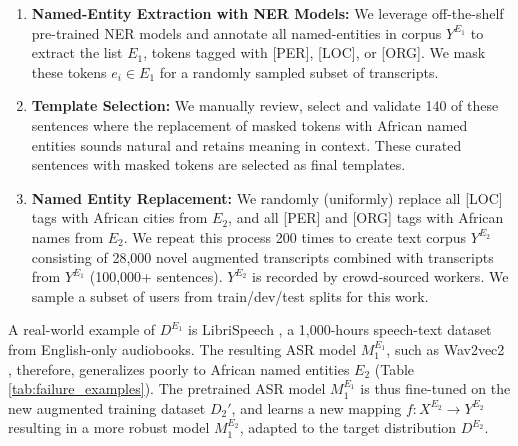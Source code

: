 \documentclass{INTERSPEECH2023}
\begin{document}
\begin{enumerate}
    \item \textbf{Named-Entity Extraction with NER Models:} We leverage off-the-shelf pre-trained NER models \cite{conneau2019unsupervised} and annotate all named-entities in corpus $Y^{E_{1}}$ to extract the list $E_1$, tokens tagged with [PER], [LOC], or [ORG]. We mask these tokens $e_i \in E_1$ for a randomly sampled subset of transcripts. 
    \item \textbf{Template Selection:} We manually review, select and validate 140 of these sentences where the replacement of masked tokens with African named entities sounds natural and retains meaning in context. These curated sentences with masked tokens are selected as final templates.
    \item \textbf{Named Entity Replacement:} We randomly (uniformly) replace all [LOC] tags with African cities from $E_2$, and all [PER] and [ORG] tags with African names from $E_2$. We repeat this process 200 times to create text corpus $Y^{E_{2}}$ consisting of 28,000 novel augmented transcripts combined with transcripts from $Y^{E_{1}}$ (100,000+ sentences). $Y^{E_{2}}$ is recorded by crowd-sourced workers.
    We sample a subset of users from train/dev/test splits for this work. 
    
\end{enumerate}

A real-world example of $D^{E_{1}}$ is LibriSpeech \cite{panayotov2015librispeech}, a 1,000-hours speech-text dataset from English-only  audiobooks. The resulting ASR model $M_{1}^{E_{1}}$, such as Wav2vec2 \cite{baevski2020wav2vec}, therefore, generalizes poorly to African named entities ${E_{2}}$ (Table \ref{tab:failure_examples}). The pretrained ASR model  $M_{1}^{E_{1}}$ is thus fine-tuned on the new augmented training dataset $D_2'$,  and learns a new mapping $f: X^{E_{2}} \longrightarrow Y^{E_{2}}$ resulting in a more robust model $M_{1}^{E_{2}}$, adapted to the target distribution $D^{E_{2}}$.
\end{document}
